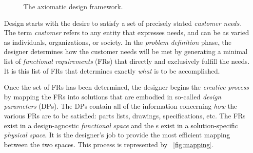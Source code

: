 \begin{figure}[H]
  \centering
  \caption{The axiomatic design framework.}
  \label{fig:design}
\end{figure}

Design starts with the desire to satisfy a set of precisely stated \emph{customer needs}.  The term \emph{customer}
refers to any entity that expresses needs, and can be as varied as individuals, organizations, or society.  In the
\emph{problem definition} phase, the designer determines how the customer needs will be met by generating a minimal
list of \emph{functional requirements} (FRs) that directly and exclusively fulfill the needs.  It is this list of
FRs that determines exactly \emph{what} is to be accomplished.

Once the set of FRs has been determined, the designer begins the \emph{creative process} by mapping the FRs into
solutions that are embodied in so-called \emph{design parameters} (DPs).  The DPs contain all of the information
concerning \emph{how} the various FRs are to be satisfied: parts lists, drawings, specifications, etc.  The FRs
exist in a design-agnostic \emph{functional space} and the {\DP}s exist in a solution-specific \emph{physical
  space}.  It is the designer's job to provide the most efficient mapping between the two spaces.  This process is
represented by \figurename~\ref{fig:mapping}.

